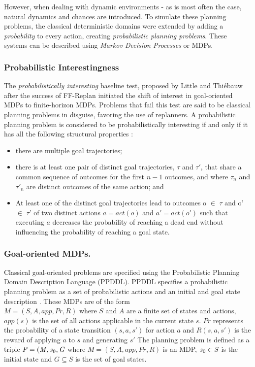 \documentclass[runningheads,a4paper]{llncs}
\begin{document}
However, when dealing with dynamic environments - as is most often the case, natural dynamics and chances are introduced. To simulate these planning problems, the classical deterministic domains were extended by adding a \emph{probability} to every action, creating \emph{probabilistic planning problems}. These systems can be described using \emph{Markov Decision Processes} or MDPs.

\subsubsection{Probabilistic Interestingness}
\label{sec:interesting}
The \emph{probabilistically interesting} baseline test, proposed by Little and Thi\'ebauw \cite{little2007probvsreplan} after the success of FF-Replan initiated the shift of interest in goal-oriented MDPs to finite-horizon MDPs. Problems that fail this test are said to be classical planning problems in disguise, favoring the use of replanners. A probabilistic planning problem is considered to be probabilistically interesting if and only if it has all the following structural properties \cite{little2007probvsreplan}:

\begin{itemize}
	\item there are multiple goal trajectories;
	\item there is at least one pair of distinct goal trajectories, $\tau$ and $\tau'$, that share a common sequence of outcomes for the first $n-1$ outcomes, and where $\tau_n$ and $\tau'_n$ are distinct outcomes of the same action; and
	\item At least one of the distinct goal trajectories lead to outcomes o $\in$ $\tau$ and o' $\in$ $\tau$' of two distinct actions $a = act(o)$ and $a'= act(o')$ such that executing $a$ decreases the probability of reaching a dead end without influencing the probability of reaching a goal state.
\end{itemize}

\subsubsection{Goal-oriented MDPs. } Classical goal-oriented problems are specified using the Probabilistic Planning Domain Description Language (PPDDL). PPDDL specifies a probabilistic planning problem as a set of probabilistic actions and an initial and goal state description \cite{FFReplan}. These MDPs are of the form \\ $\mathit{M = (S, A, app, Pr, R)}$ where $\mathit{S}$ and $\mathit{A}$ are a finite set of states and actions, $\mathit{app(s)}$ is the set of all actions applicable in the current state $\mathit{s}$. $\mathit{Pr}$ represents the probability of a state transition $\mathit{(s, a, s')}$ for action $\mathit{a}$ and $\mathit{R(s, a, s')}$ is the reward of applying $\mathit{a}$ to $\mathit{s}$ and generating $\mathit{s'}$ The planning problem is defined as a triple $\mathit{P = (M, s\textsubscript{0}, G}$ where $\mathit{M = (S, A, app, Pr, R)}$ is an MDP, $\mathit{s\textsubscript{0} \in S}$ is the initial state and $\mathit{G \subseteq S}$ is the set of goal states.
\end{document}
